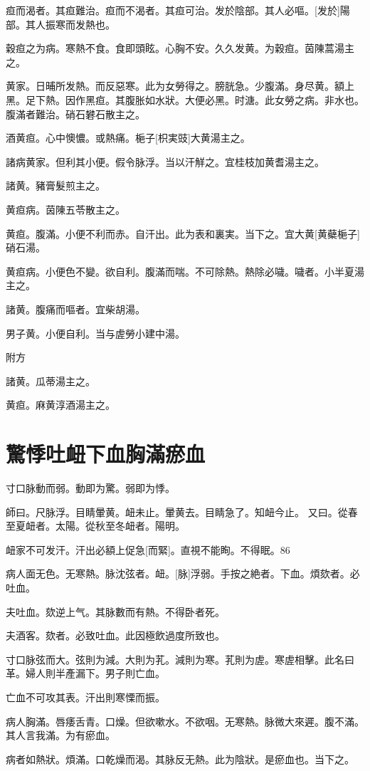 \documentclass[12pt,twoside,UTF8,b5paper]{ctexbook}
\begin{document}
疸而渴者。其疸難治。疸而不渴者。其疸可治。发於陰部。其人必嘔。[发於]陽部。其人振寒而发熱也。

穀疸之为病。寒熱不食。食即頭眩。心胸不安。久久发黄。为穀疸。茵陳蒿湯主之。

黄家。日晡所发熱。而反惡寒。此为女勞得之。膀胱急。少腹滿。身尽黄。額上黑。足下熱。因作黑疸。其腹胀如水狀。大便必黑。时溏。此女勞之病。非水也。腹滿者難治。硝石礬石散主之。

酒黄疸。心中懊憹。或熱痛。梔子[枳実豉]大黄湯主之。

諸病黄家。但利其小便。假令脉浮。当以汗觧之。宜桂枝加黄耆湯主之。

諸黄。豬膏髮煎主之。

黄疸病。茵陳五苓散主之。

黄疸。腹滿。小便不利而赤。自汗出。此为表和裏実。当下之。宜大黄[黄蘗梔子]硝石湯。

黄疸病。小便色不變。欲自利。腹滿而喘。不可除熱。熱除必噦。噦者。小半夏湯主之。

諸黄。腹痛而嘔者。宜柴胡湯。

男子黄。小便自利。当与虗勞小建中湯。

附方

諸黄。瓜蒂湯主之。

黄疸。麻黄淳酒湯主之。

\chapter{驚悸吐衄下血胸滿瘀血}

寸口脉動而弱。動即为驚。弱即为悸。

師曰。尺脉浮。目睛暈黄。衄未止。暈黄去。目睛急了。知衄今止。
又曰。從春至夏衄者。太陽。從秋至冬衄者。陽明。

衄家不可发汗。汗出必額上促急[而緊]。直視不能眴。不得眠。86

病人面无色。无寒熱。脉沈弦者。衄。[脉]浮弱。手按之絶者。下血。煩欬者。必吐血。

夫吐血。欬逆上气。其脉數而有熱。不得卧者死。

夫酒客。欬者。必致吐血。此因極飲過度所致也。

寸口脉弦而大。弦則为減。大則为芤。減則为寒。芤則为虗。寒虗相擊。此名曰革。婦人則半產漏下。男子則亡血。

亡血不可攻其表。汗出則寒慄而振。

病人胸滿。唇痿舌青。口燥。但欲嗽水。不欲咽。无寒熱。脉微大來遲。腹不滿。其人言我滿。为有瘀血。

病者如熱狀。煩滿。口乾燥而渴。其脉反无熱。此为陰狀。是瘀血也。当下之。
\end{document}
